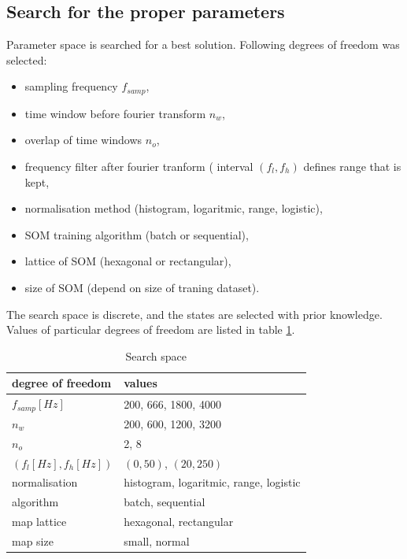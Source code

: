 \documentclass[a4paper,journal]{IEEEtran}
\begin{document}
\subsection{Search for the proper parameters}
Parameter space is searched for a best solution. Following degrees of 
freedom was selected:
\begin{itemize}
	\item sampling frequency $ f_{samp} $,
	\item time window before fourier transform $ n_w $,
	\item overlap of time windows $ n_o $,
	\item frequency filter after fourier tranform ( interval $ (f_l, f_h) $ defines 
	range that is kept,
	\item normalisation method (histogram, logaritmic, range, logistic),
	\item SOM training algorithm (batch or sequential),
	\item lattice of SOM (hexagonal or rectangular),
	\item size of SOM (depend on size of traning dataset).
\end{itemize}
The search space is discrete, and the states are selected with prior knowledge.
Values of particular degrees of freedom are listed  in table \ref{searchspace}.


\begin{table}[h]
\caption{Search space}
	\begin{center}
		\begin{tabular}{|l| l |}			
			\hline
			degree of freedom & values \\
			\hline
			\hline
			$ f_{samp} [Hz] $ & 200, 666, 1800, 4000\\
			\hline
			$ n_w $ & 200, 600, 1200, 3200 \\
			\hline
			$ n_o $ & 2, 8 \\
			\hline
			$ (f_l[Hz], f_h[Hz]) $ & $ (0, 50) $,  $ (20, 250) $  \\
			\hline
			normalisation & histogram, logaritmic, range, logistic \\
			\hline
			algorithm & batch, sequential  \\
			\hline
			map lattice & hexagonal, rectangular \\
			\hline
			map size  & small, normal \\
			\hline
		\end{tabular}
	\end{center}
\label{searchspace}
\end{table}
\end{document}
